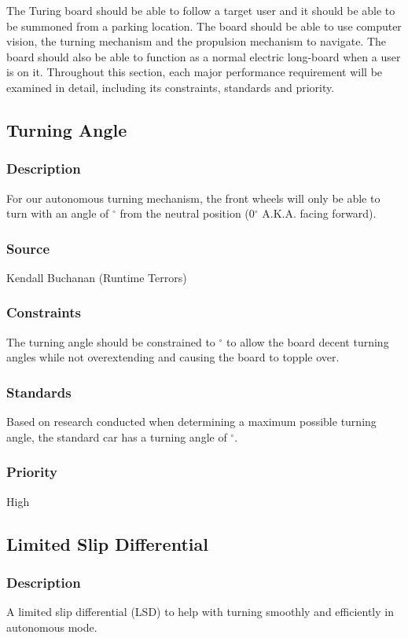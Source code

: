 The Turing board should be able to follow a target user and it should be able to be summoned from a parking location. The board should be able to use computer vision, the turning mechanism and the propulsion mechanism to navigate. The board should also be able to function as a normal electric long-board when a user is on it. Throughout this section, each major performance requirement will be examined in detail, including its constraints, standards and priority.

\subsection{Turning Angle}
\subsubsection{Description}
For our autonomous turning mechanism, the front wheels will only be able to turn with an angle of $^{\circ}$ from the neutral position (0$^{\circ}$ A.K.A. facing forward).
\subsubsection{Source}
Kendall Buchanan (Runtime Terrors)
\subsubsection{Constraints}
The turning angle should be constrained to $^{\circ}$ to allow the board decent turning angles while not overextending and causing the board to topple over.
\subsubsection{Standards}
Based on research conducted when determining a maximum possible turning angle, the standard car has a turning angle of $^{\circ}$.
\subsubsection{Priority}
High

\subsection{Limited Slip Differential}
\subsubsection{Description}
A limited slip differential (LSD) to help with turning smoothly and efficiently in autonomous mode.
